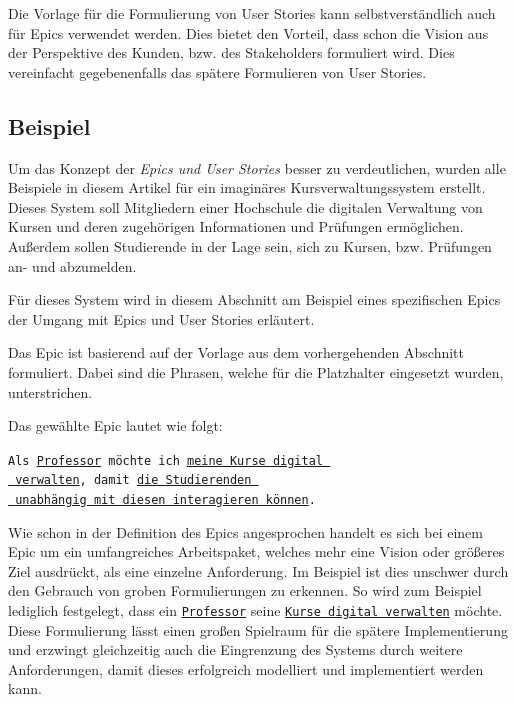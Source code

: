 \documentclass[acmtog]{acmart}
\begin{document}
Die Vorlage für die Formulierung von User Stories kann selbstverständlich auch für Epics verwendet werden.
Dies bietet den Vorteil, dass schon die Vision aus der Perspektive des Kunden, bzw. des Stakeholders formuliert
wird. Dies vereinfacht gegebenenfalls das spätere Formulieren von User Stories.

\subsection{Beispiel}
Um das Konzept der \emph{Epics und User Stories} besser zu verdeutlichen, wurden alle Beispiele in diesem
Artikel für ein imaginäres Kursverwaltungssystem erstellt.
Dieses System soll Mitgliedern einer Hochschule die digitalen Verwaltung von Kursen und deren zugehörigen Informationen
und Prüfungen ermöglichen.
Außerdem sollen Studierende in der Lage sein, sich zu Kursen, bzw. Prüfungen an- und abzumelden.

Für dieses System wird in diesem Abschnitt am Beispiel eines spezifischen Epics der Umgang mit Epics und User Stories erläutert.

Das Epic ist basierend auf der Vorlage aus dem vorhergehenden Abschnitt formuliert.
Dabei sind die Phrasen, welche für die Platzhalter eingesetzt wurden, unterstrichen.

Das gewählte Epic lautet wie folgt:

\vspace{1em}
\texttt{Als \underline{Professor} möchte ich \underline{meine Kurse digital }\\
	\hspace*{3em}\underline{ verwalten}, damit \underline{die Studierenden }\\
	\hspace*{4em} \underline{ unabhängig mit diesen interagieren können}.}
\vspace{1em}

Wie schon in der Definition des Epics angesprochen handelt es sich bei einem Epic um ein umfangreiches
Arbeitspaket, welches mehr eine Vision oder größeres Ziel ausdrückt, als eine einzelne Anforderung.
Im Beispiel ist dies unschwer durch den Gebrauch von groben Formulierungen zu erkennen. So wird zum
Beispiel lediglich festgelegt, dass ein \underline{\texttt{Professor}} seine \underline{\texttt{Kurse digital verwalten}}
möchte. Diese Formulierung lässt einen großen Spielraum für die spätere Implementierung und erzwingt gleichzeitig
auch die Eingrenzung des Systems durch weitere Anforderungen, damit dieses erfolgreich modelliert und implementiert werden kann.
\end{document}
